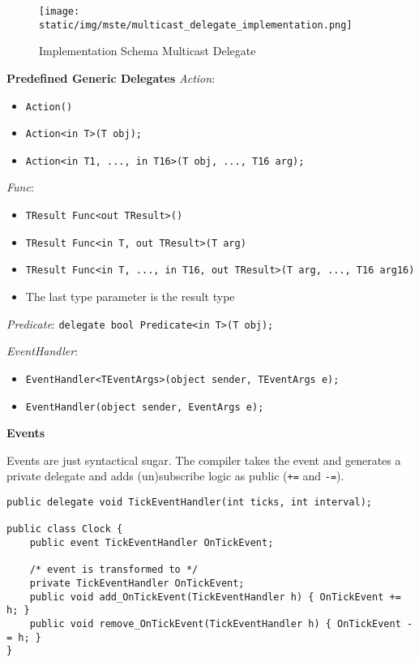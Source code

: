 \documentclass[11pt,twoside,landscape]{article}
\begin{document}
\begin{multicols}{3}
\begin{figure}[htbp]
\centering
\texttt{[image: static/img/mste/multicast\_delegate\_implementation.png]}
\caption{\label{fig:org141c5a8}Implementation Schema Multicast Delegate}
\end{figure}


\textbf{Predefined Generic Delegates}
\emph{Action}:
\begin{itemize}
\item \texttt{Action()}
\item \texttt{Action<in T>(T obj);}
\item \texttt{Action<in T1, ..., in T16>(T obj, ..., T16 arg);}
\end{itemize}

\emph{Func}:
\begin{itemize}
\item \texttt{TResult Func<out TResult>()}
\item \texttt{TResult Func<in T, out TResult>(T arg)}
\item \texttt{TResult Func<in T, ..., in T16, out TResult>(T arg, ..., T16 arg16)}
\item The last type parameter is the result type
\end{itemize}

\emph{Predicate}:
\texttt{delegate bool Predicate<in T>(T obj);}

\emph{EventHandler}:
\begin{itemize}
\item \texttt{EventHandler<TEventArgs>(object sender, TEventArgs e);}
\item \texttt{EventHandler(object sender, EventArgs e);}
\end{itemize}


\textbf{Events}

Events are just syntactical sugar.
The compiler takes the event and generates a private delegate and adds (un)subscribe logic as public (\texttt{+=} and \texttt{-=}).
\lstset{language=csharp,label= ,caption= ,captionpos=b,numbers=none}
\begin{lstlisting}
public delegate void TickEventHandler(int ticks, int interval);

public class Clock {
    public event TickEventHandler OnTickEvent;

    /* event is transformed to */
    private TickEventHandler OnTickEvent;
    public void add_OnTickEvent(TickEventHandler h) { OnTickEvent += h; }
    public void remove_OnTickEvent(TickEventHandler h) { OnTickEvent -= h; }
}
\end{lstlisting}



\end{multicols}
\end{document}
